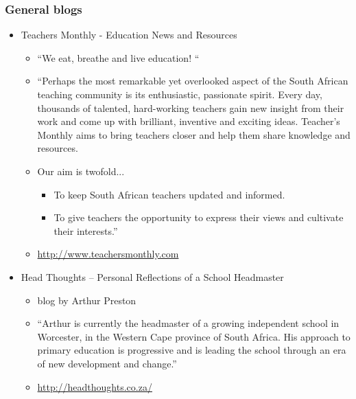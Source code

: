 \subsubsection{General blogs}
\begin{itemize}
\item Teachers Monthly - Education News and Resources
    \begin{itemize}[noitemsep]
      \item “We eat, breathe and live education! “
      \item “Perhaps the most remarkable yet overlooked aspect of the South African teaching community is its enthusiastic, passionate spirit. Every day, thousands of talented, hard-working teachers gain new insight from their work and come up with brilliant, inventive and exciting ideas. Teacher’s Monthly aims to bring teachers closer and help them share knowledge and resources.
      \item Our aim is twofold...
	    \begin{itemize}[noitemsep]
	      \item To keep South African teachers updated and informed.
	    \item To give teachers the opportunity to express their views and cultivate their interests.”
	    \end{itemize}
      \item \url{http://www.teachersmonthly.com }
    \end{itemize}

\item Head Thoughts – Personal Reflections of a School Headmaster
    \begin{itemize}[noitemsep]
	\item blog by Arthur Preston
	\item “Arthur is currently the headmaster of a growing independent school in Worcester, in the Western Cape province of South Africa. His approach to primary education is progressive and is leading the school through an era of new development and change.”
\item \url{http://headthoughts.co.za/ }
    \end{itemize}
\end{itemize}

